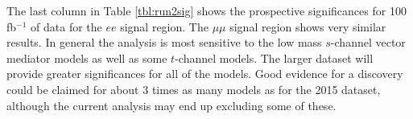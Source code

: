 The last column in Table \ref{tbl:run2sig} shows the prospective significances for 100 fb$^{-1}$ of data for the $ee$ signal region. The $\mu\mu$ signal region shows very similar results. In general the analysis is most sensitive to the low mass $s$-channel vector mediator models as well as some $t$-channel models. The larger dataset will provide greater significances for all of the models. Good evidence for a discovery could be claimed for about 3 times as many models as for the 2015 dataset, although the current analysis may end up excluding some of these.